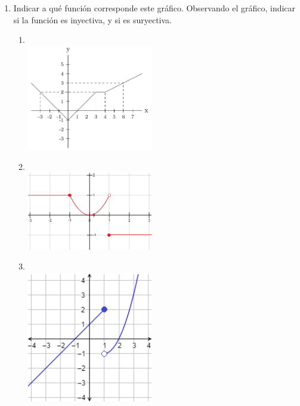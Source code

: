 \documentclass[a4paper]{article}
\newcommand{\exercise}{\item}
\begin{document}
\begin{enumerate}
\begin{multicols}{2}
\begin{enumerate} [label=(\alph*)]
		\item $\left\{\begin{matrix}\hspace{-2mm}3x-2 ~~~ si ~~x\leq 2 ~~\\ \hspace{-2mm} ~~~~~ x^2 ~~~~~~  si ~~2<x\leq 3 \\ \hspace{-2mm}\displaystyle{\frac{x+6}{9}} ~~~ si ~~x>3 ~~\end{matrix}\right.$
		\item $\left\{\begin{matrix}x^2+7 ~~~~ si ~~x\leq 2\\ x+4 ~~~~~ si ~~x>2\end{matrix}\right.$
	\end{enumerate}
	\end{multicols}
	\newpage
	\exercise Indicar a qué función corresponde este gráfico. Observando el gráfico, indicar si la función es inyectiva, y si es suryectiva.
	\begin{multicols}{2}
	\begin{enumerate} [label=(\alph*)]
		\item ~\\ [-12pt] \includegraphics[width=55mm]{func1.png} \vfill
		\item ~\\ [-12pt] \includegraphics[width=55mm]{func2.png} \vfill
		\item ~\\ [-12pt] \includegraphics[width=55mm]{func3.png} \vfill

\end{enumerate}
\end{multicols}
\end{enumerate}
\end{document}
